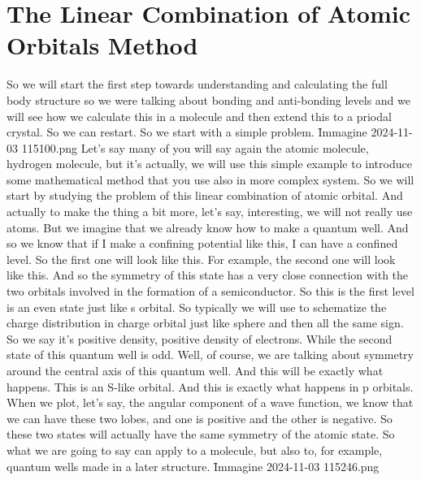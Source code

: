 \section{The Linear Combination of Atomic Orbitals Method}
So we will start the first step towards understanding and calculating the full body structure so we were talking about bonding and anti-bonding levels and we will see how we calculate this in a molecule and then extend this to a priodal crystal. So we can restart. So we start with a simple problem.
\f{Immagine 2024-11-03 115100.png}
Let's say many of you will say again the atomic molecule, hydrogen molecule, but it's actually, we will use this simple example to introduce some mathematical method that you use also in more complex system. So we will start by studying the problem of this linear combination of atomic orbital. And actually to make the thing a bit more, let's say, interesting, we will not really use atoms. But we imagine that we already know how to make a quantum well. And so we know that if I make a confining potential like this, I can have a confined level. So the first one will look like this. For example, the second one will look like this. And so the symmetry of this state has a very close connection with the two orbitals involved in the formation of a semiconductor. So this is the first level is an even state just like s orbital. So typically we will use to schematize the charge distribution in charge orbital just like sphere and then all the same sign. So we say it's positive density, positive density of electrons. While the second state of this quantum well is odd. Well, of course, we are talking about symmetry around the central axis of this quantum well. And this will be exactly what happens. This is an S-like orbital. And this is exactly what happens in p orbitals. When we plot, let's say, the angular component of a wave function, we know that we can have these two lobes, and one is positive and the other is negative. So these two states will actually have the same symmetry of the atomic state. So what we are going to say can apply to a molecule, but also to, for example, quantum wells made in a later structure.
\f{Immagine 2024-11-03 115246.png}
